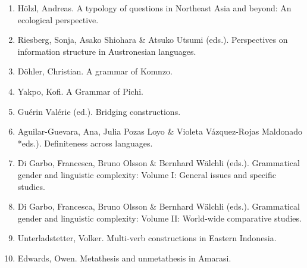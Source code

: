 \begin{multicols}{2}
\begin{enumerate}
\item Hölzl, Andreas. A typology of questions in Northeast Asia and beyond: An ecological perspective.
\item Riesberg, Sonja,  Asako Shiohara \& Atsuko Utsumi (eds.). Perspectives on information structure in Austronesian languages.
\item Döhler, Christian. A grammar of Komnzo.
\item Yakpo, Kofi. A Grammar of Pichi.
\item Guérin Valérie (ed.). Bridging constructions.
\item Aguilar-Guevara, Ana,   Julia Pozas Loyo \&  Violeta Vázquez-Rojas Maldonado *eds.). Definiteness across languages.
\item Di Garbo, Francesca, Bruno Olsson \& Bernhard Wälchli (eds.). Grammatical gender and linguistic complexity: Volume I: General issues and specific studies.
\item Di Garbo, Francesca, Bruno Olsson \& Bernhard Wälchli (eds.). Grammatical gender and linguistic complexity: Volume II: World-wide comparative studies.
\item Unterladstetter, Volker. Multi-verb constructions in Eastern Indonesia.
\item Edwards, Owen. Metathesis and unmetathesis in Amarasi.
\end{enumerate}
\end{multicols}


